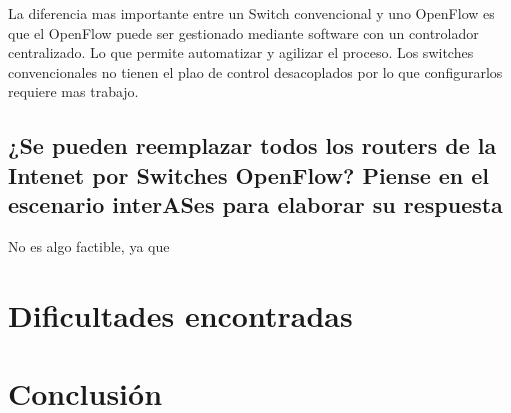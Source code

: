 \documentclass{article}
\begin{document}
La diferencia mas importante entre un Switch convencional y uno OpenFlow es que el OpenFlow puede
ser gestionado mediante software con un controlador centralizado. Lo que permite automatizar
y agilizar el proceso.
Los switches convencionales no tienen el plao de control desacoplados por lo que configurarlos
requiere mas trabajo.

\subsection{\texorpdfstring{\textbf{¿Se pueden reemplazar todos los routers de la Intenet por Switches OpenFlow? Piense en el escenario interASes para elaborar su respuesta}}{¿Se pueden reemplazar todos los routers de la Intenet por Switches OpenFlow? Piense en el escenario interASes para elaborar su respuesta}}\label{la-capa-de-transporte-del-stack-tcpip-ofrece-dos-protocolos-tcp-y-udp.-quuxe9-servicios-proveen-dichos-protocolos-cuuxe1les-son-sus-caracteruxedsticas-cuuxe1ndo-es-apropiado-utilizar-cada-uno}

No es algo factible, ya que

\section{\texorpdfstring{\textbf{Dificultades
encontradas}}{Dificultades encontradas}}\label{dificultades-encontradas}

\section{\texorpdfstring{\textbf{Conclusión}}{Conclusión}}\label{conclusiuxf3n-wip}
\end{document}
